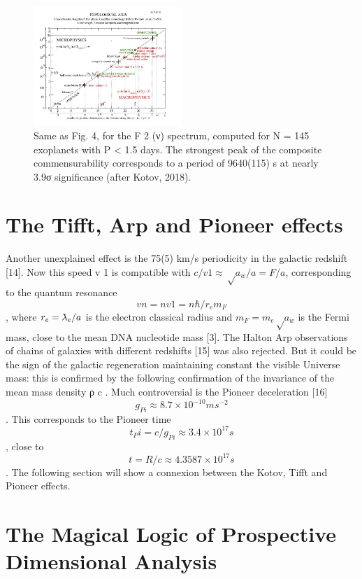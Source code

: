 \begin{figure}
\centering
\includegraphics[width=0.5\textwidth]{./figures/figure}
\caption{Same as Fig. 4, for the F 2 (ν) spectrum, computed for N = 145 exoplanets with P < 1.5
days. The strongest peak of the composite commensurability corresponds to a period of 9640(115) s
at nearly 3.9σ significance (after Kotov, 2018).}
\label{fig:figure_label}
\end{figure}


\section {The Tifft, Arp and Pioneer effects}

Another unexplained effect is the 75(5) km/s periodicity in the galactic redshift [14]. Now this
speed v 1 is compatible with $c/v 1 ≈ √a_w /a = F/a$, corresponding to the quantum resonance $$v n = nv 1 =n\hbar /r_e m_F $$, where $r_e = \lambdabar_e /a$ is the electron classical radius and $m_F = m_e √a_w$ is the Fermi mass, close to the
mean DNA nucleotide mass [3].
The Halton Arp observations of chains of galaxies with different redshifts [15] was also
rejected. But it could be the sign of the galactic regeneration maintaining constant the visible
Universe mass: this is confirmed by the following confirmation of the invariance of the mean mass
density ρ c .
Much controversial is the Pioneer deceleration [16] $$g_{Pi} ≈ 8.7 \times 10^{-10} ms^{-2}$$ . This corresponds to
the Pioneer time $$t_Pi = c/g_{Pi} ≈ 3.4 \times 10^{17} s$$, close to $$t = R/c ≈ 4.3587 \times 10^{17} s$$. The following section will show a connexion between the Kotov, Tifft and Pioneer effects.

\section {The Magical Logic of Prospective Dimensional Analysis}


